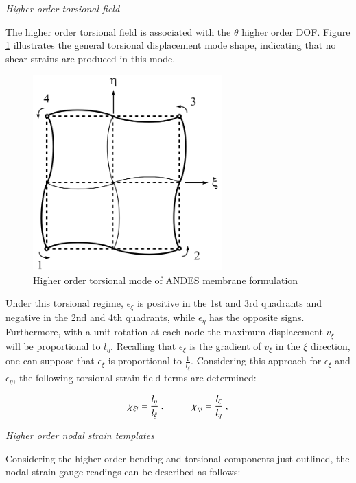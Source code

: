 \textit{Higher order torsional field}

The higher order torsional field is associated with the $\bar{\theta}$ higher order DOF. Figure \ref{fig:AndesTorsional} illustrates the general torsional displacement mode shape, indicating that no shear strains are produced in this mode.

\begin{figure}[H]
	\centering
	\def\svgwidth{\columnwidth}
	\includegraphics[width=7.3cm]{images/ANDES_torsional_mode.png}
	\caption{Higher order torsional mode of ANDES membrane formulation \cite{Hau94}}
	\label{fig:AndesTorsional}
\end{figure}

Under this torsional regime, $\epsilon_\xi$ is positive in the 1st and 3rd quadrants and negative in the 2nd and 4th quadrants, while $\epsilon_\eta$ has the opposite signs. Furthermore, with a unit rotation at each node the maximum displacement $v_\xi$ will be proportional to $l_\eta$. Recalling that $\epsilon_{\xi}$ is the gradient of $v_\xi$ in the $\xi$ direction, one can suppose that $\epsilon_{\xi}$ is proportional to $\frac{1}{l_\xi}$. Considering this approach for $\epsilon_{\xi}$ and $\epsilon_{\eta}$, the following torsional strain field terms are determined:

\begin{equation} 
\chi_{\xi t} = \frac{l_\eta}{l_\xi}\ ,
\hspace{10mm}
\chi_{\eta t} = \frac{l_\xi}{l_\eta}\ ,
\label{equation13}
\end{equation}

\textit{Higher order nodal strain templates}

Considering the higher order bending and torsional components just outlined, the nodal strain gauge readings can be described as follows:


